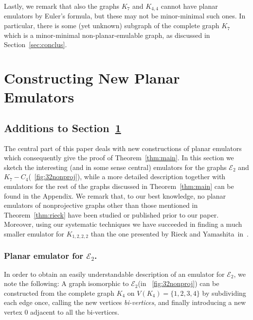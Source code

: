 \documentclass[envcountsect,envcountsame]{llncs}
\newenvironment{onlynoaccum}{}{}
\newcommand{\KK}{\ensuremath{{K}_7 - C_4}\xspace}
\newcommand{\KKK}{\ensuremath{K_{1,2,2,2}}\xspace}
\newcommand{\EE}{\ensuremath{\mathcal{E}_2}\xspace}
\begin{document}
Lastly, we remark that also the graphs $K_7$ and $K_{4,4}$ cannot have
planar emulators by Euler's formula, but these may not be minor-minimal such ones.
In particular, there is some (yet unknown) subgraph of the complete graph $K_7$ which is
a minor-minimal non-planar-emulable graph, as discussed in
Section~\ref{sec:conclus}.









\section{Constructing New Planar Emulators}
\label{sec:construct}
\begin{onlyaccum}
\subsection{Additions to Section~\ref{sec:construct}}
\end{onlyaccum}

The central part of this paper deals with new constructions of planar
emulators which consequently give the proof of Theorem~\ref{thm:main}.
\begin{onlynoaccum}
In this section we sketch the interesting
(and in some sense central) emulators for
the graphs \EE and \KK (\figurename~\ref{fig:32nonproj}),
while a more detailed description together with emulators for the rest
of the graphs discussed in Theorem~\ref{thm:main} can be found in the Appendix. 
\end{onlynoaccum}
We remark that, to our best knowledge, no planar emulators of nonprojective 
graphs other than those mentioned in Theorem~\ref{thm:rieck} have been 
studied or published prior to our paper.
Moreover, using our systematic techniques we have succeeded in
finding a much smaller emulator for \KKK than the one presented by Rieck and
Yamashita~in~\cite{cit:rieck}.



\subsubsection*{Planar emulator for \EE.}
In order to obtain an easily understandable description of an emulator for \EE,
we note the following:
A graph isomorphic to \EE (in \figurename~\ref{fig:32nonproj}) can be constructed
from the complete graph $K_4$ on $V(K_4)=\{1,2,3,4\}$
by subdividing each edge once, calling the new vertices \emph{bi-vertices},
and finally introducing a new vertex $0$ adjacent to all the bi-vertices.
\end{document}
